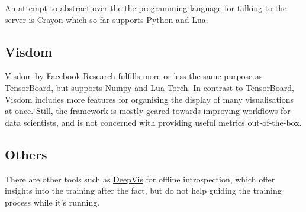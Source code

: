 An attempt to abstract over the the programming language for talking to
the server is \href{https://github.com/torrvision/crayon}{Crayon} which
so far supports Python and Lua.

\hypertarget{visdom}{%
\subsection*{Visdom}\label{visdom}}

Visdom by Facebook Research fulfills more or less the same purpose as
TensorBoard, but supports Numpy and Lua Torch. In contrast to
TensorBoard, Visdom includes more features for organising the display of
many visualisations at once. Still, the framework is mostly geared
towards improving workflows for data scientists, and is not concerned
with providing useful metrics out-of-the-box.

\hypertarget{others}{%
\subsection*{Others}\label{others}}

There are other tools such as
\href{http://yosinski.com/deepvis}{DeepVis} for offline introspection,
which offer insights into the training after the fact, but do not help
guiding the training process while it's running.
